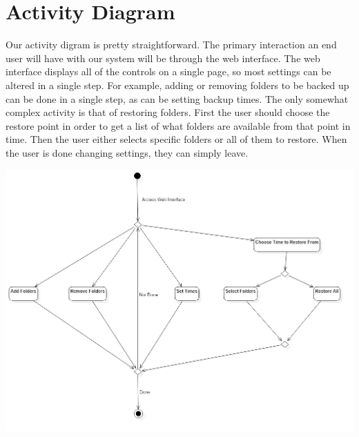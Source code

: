 \chapter{Activity Diagram}

Our activity digram is pretty straightforward.  The primary interaction an end user will have with our system will be through the web interface.  The web interface displays all of the controls on a single page, so most settings can be altered in a single step.  For example, adding or removing folders to be backed up can be done in a single step, as can be setting backup times.  The only somewhat complex activity is that of restoring folders.  First the user should choose the restore point in order to get a list of what folders are available from that point in time.  Then the user either selects specific folders or all of them to restore.  When the user is done changing settings, they can simply leave.

\includegraphics[scale=0.45]{images/ActivityDiagram1.jpg}